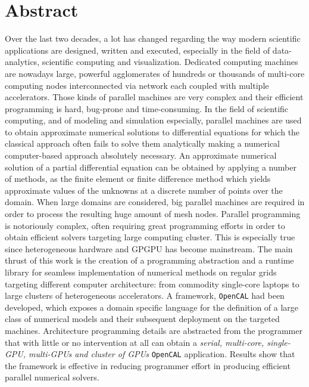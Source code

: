 \begingroup
\let\clearpage\relax
\let\cleardoublepage\relax
\let\cleardoublepage\relax

\chapter*{Abstract}

Over the last two decades, a lot has changed regarding the way modern scientific applications are designed, written and executed, especially in the field of data-analytics, scientific computing and visualization. Dedicated computing machines are nowadays large, powerful agglomerates of hundreds or thousands of multi-core computing nodes interconnected via  network each coupled with multiple accelerators. Those kinds of parallel machines are very complex and their efficient programming is hard, bug-prone and time-consuming. 
In the field of scientific computing, and of modeling and simulation especially, parallel machines are used to obtain approximate numerical solutions to differential equations
for which the classical approach often fails to solve them analytically making a numerical computer-based approach absolutely necessary.
An approximate numerical solution of a partial differential equation can be obtained by applying a number of methods, as the finite element or finite difference method which yields approximate values of the unknowns at a discrete number of points over the domain.
When large domains are considered, big parallel machines are required in order to process the resulting huge amount of mesh nodes. Parallel programming is notoriously complex, often requiring great programming efforts in order to obtain efficient solvers targeting large computing cluster. This is especially true since heterogeneous hardware and GPGPU has become mainstream.
The main thrust of this work is the creation of a programming abstraction and a runtime library for seamless implementation of numerical methods on regular grids targeting different computer architecture: from commodity single-core laptops to large clusters of heterogeneous accelerators. A framework, \texttt{OpenCAL} had been developed, which exposes a domain specific language for the definition of a large class of numerical models and their subsequent deployment on the targeted machines. Architecture programming details are abstracted from the programmer that with little or no intervention at all can obtain a \textit{serial, multi-core, single-GPU, multi-GPUs and cluster of GPUs} \texttt{OpenCAL} application. 
Results show that the framework is effective in reducing programmer effort in producing efficient parallel numerical solvers.


